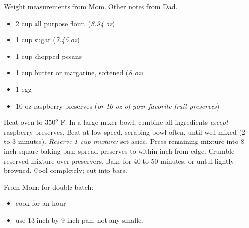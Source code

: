 
Weight measurements from Mom. Other notes from Dad.

\ingredients
\begin{itemize}
    \item 2  cup all purpose flour. (\textit{8.94 oz})
    \item 1 cup sugar (\textit{7.45 oz})
    \item 1 cup chopped pecans
    \item 1 cup butter or margarine, softened (\textit{8 oz})
    \item 1 egg
    \item 10 oz raspberry preserves (\textit{or 10 oz of your favorite fruit preserves})
\end{itemize}

\instructions

Heat oven to $350 ^o$ F. 
In a large mixer bowl, combine all ingredients \textit{except} raspberry preserves.
Beat at low speed, scraping bowl often, until well mixed (2 to 3 minutes).
\textit{Reserve 1  cup mixture;} set aside.
Press remaining mixture into 8 inch square baking pan; spread preserves to within  inch from edge.
Crumble reserved  mixture over preservers.
Bake for 40 to 50 minutes, or untul lightly browned.
Cool completely; cut into bars.

\notes
From Mom: for double batch:
\begin{itemize}
    \item cook for an hour
    \item use 13 inch by 9 inch pan, not any smaller
    
\end{itemize}
